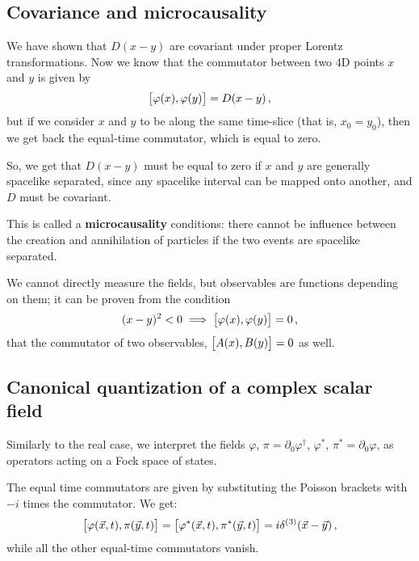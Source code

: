 \documentclass[main.tex]{subfiles}
\begin{document}
\subsection{Covariance and microcausality} \label{sec:covariance-microcausality}

We have shown that \(D(x-y)\) are covariant under proper Lorentz transformations. Now we know that the commutator between two 4D points \(x\) and \(y\) is given by 
%
\begin{align}
\qty[\varphi (x), \varphi (y)] = D(x-y)
\,,
\end{align}
%
but if we consider \(x\) and \(y\) to be along the same time-slice (that is, \(x_0 = y_0 \)), then we get back the equal-time commutator, which is equal to zero. 

So, we get that \(D(x-y)\) must be equal to zero if \(x\) and \(y\) are generally spacelike separated, since any spacelike interval can be mapped onto another, and \(D\) must be covariant. 

This is called a \textbf{microcausality} conditions: there cannot be influence between the creation and annihilation of particles if the two events are spacelike separated. 

We cannot directly measure the fields, but observables are functions depending on them; it can be proven from the condition 
%
\begin{align}
(x-y)^2<0 \implies
\qty[\varphi (x), \varphi (y)] = 0
\,,
\end{align}
%
that the commutator of two observables, \(\qty[A(x), B(y)] =0\) as well.

\subsection{Canonical quantization of a complex scalar field}

Similarly to the real case, we interpret the fields \(\varphi \), \(\pi = \partial_0 \varphi ^\dag\), \(\varphi^{*}\), \(\pi^{*} = \partial_{0} \varphi \), as operators acting on a Fock space of states.

The equal time commutators are given by substituting the Poisson brackets with \(-i\) times the commutator. We get: 
%
\begin{align}
\qty[\varphi (\vec{x}, t), \pi (\vec{y}, t)] =
\qty[\varphi^{*} (\vec{x}, t), \pi^{*} (\vec{y}, t)] = i \delta^{(3)} (\vec{x} - \vec{y}) 
\,,
\end{align}
%
while all the other equal-time commutators vanish.
\end{document}
